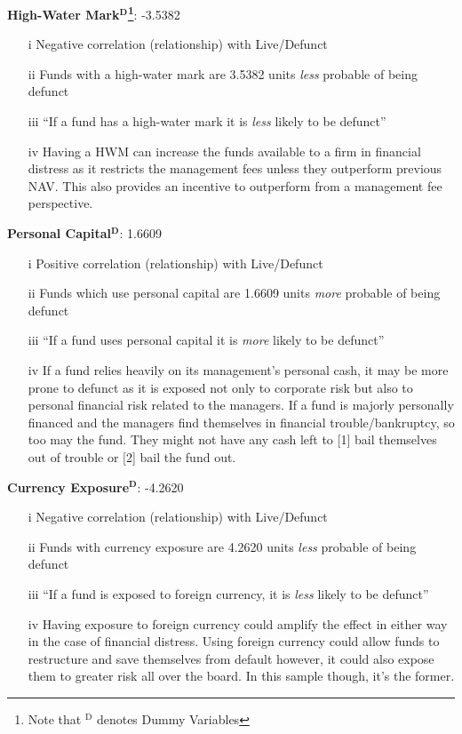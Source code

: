 \documentclass[11pt, english]{article}
\begin{document}
	\textbf{High-Water Mark$\mathbf{^D}$\footnote{Note that $\mathrm{^D}$ denotes Dummy Variables}}: -3.5382

        \begin{itemize}
        \setlength\itemsep{0cm}
                \item[i] Negative correlation (relationship) with Live/Defunct
		\item[ii] Funds with a high-water mark are 3.5382 units \textit{less} probable of being defunct
		\item[iii] ``If a fund has a high-water mark it is \textit{less} likely to be defunct''
                \item[iv] Having a HWM can increase the funds available to a firm in financial distress as it restricts the management fees unless they outperform previous NAV. This also provides an incentive to outperform from a management fee perspective.
        \end{itemize}

	\textbf{Personal Capital$\mathbf{^D}$}: 1.6609

        \begin{itemize}
        \setlength\itemsep{0cm}
                \item[i] Positive correlation (relationship) with Live/Defunct
		\item[ii] Funds which use personal capital are 1.6609 units \textit{more} probable of being defunct
		\item[iii] ``If a fund uses personal capital it is \textit{more} likely to be defunct''
                \item[iv] If a fund relies heavily on its management’s personal cash, it may be more prone to defunct as it is exposed not only to corporate risk but also to personal financial risk related to the managers. If a fund is majorly personally financed and the managers find themselves in financial trouble/bankruptcy, so too may the fund. They might not have any cash left to [1] bail themselves out of trouble or [2] bail the fund out.
        \end{itemize}

	\textbf{Currency Exposure$\mathbf{^D}$}: -4.2620

        \begin{itemize}
        \setlength\itemsep{0cm}
                \item[i] Negative correlation (relationship) with Live/Defunct
		\item[ii] Funds with currency exposure are 4.2620 units \textit{less} probable of being defunct
                \item[iii] ``If a fund is exposed to foreign currency, it is \textit{less} likely to be defunct''
                \item[iv] Having exposure to foreign currency could amplify the effect in either way in the case of financial distress. Using foreign currency could allow funds to restructure and save themselves from default however, it could also expose them to greater risk all over the board. In this sample though, it’s the former.
        \end{itemize}
\end{document}
